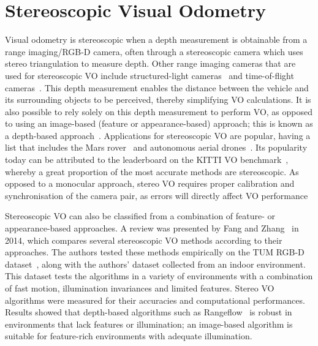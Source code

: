 \section{Stereoscopic Visual Odometry}
Visual odometry is stereoscopic when a depth measurement is obtainable from a range imaging/RGB-D camera, often through a stereoscopic camera which uses stereo triangulation to measure depth. Other range imaging cameras that are used for stereoscopic VO include structured-light cameras~\cite{liu_improved_2017,huang_visual_2017} and time-of-flight cameras~\cite{stefan_threedimensional_2009}. This depth measurement enables the distance between the vehicle and its surrounding objects to be perceived, thereby simplifying VO calculations. It is also possible to rely solely on this depth measurement to perform VO, as opposed to using an image-based (feature or appearance-based) approach; this is known as a depth-based approach~\cite{fang_experimental_2015}. Applications for stereoscopic VO are popular, having a list that includes the Mars rover~\cite{maimone_two_2007} and autonomous aerial drones~\cite{strydom_visual_2014}. Its popularity today can be attributed to the leaderboard on the KITTI VO benchmark~\cite{geiger_are_2012}, whereby a great proportion of the most accurate methods are stereoscopic. As opposed to a monocular approach, stereo VO requires proper calibration and synchronisation of the camera pair, as errors will directly affect VO performance~\cite{kitt_visual_2010}


Stereoscopic VO can also be classified from a combination of feature- or appearance-based approaches. A review was presented by Fang and Zhang~\cite{fang_experimental_2015} in 2014, which compares several stereoscopic VO methods according to their approaches. The authors tested these methods empirically on the TUM RGB-D dataset~\cite{sturm_benchmark_2012}, along with the authors' dataset collected from an indoor environment. This dataset tests the algorithms in a variety of environments with a combination of fast motion, illumination invariances and limited features. Stereo VO algorithms were measured for their accuracies and computational performances. Results showed that depth-based algorithms such as Rangeflow~\cite{jaimez_fast_2015} is robust in environments that lack features or illumination; an image-based algorithm is suitable for feature-rich environments with adequate illumination. 


